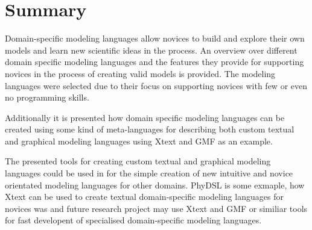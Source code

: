 \documentclass[runningheads,a4paper]{llncs}
\begin{document}
\section{Summary}\label{sec:summary}
Domain-specific modeling languages allow novices to build and explore  their own models and learn new scientific ideas in the process.
An overview over different domain specific modeling languages and the features they provide for 
supporting novices in the process of creating valid models is provided.
The modeling languages were selected due to their focus on supporting novices with few or even no programming skills.

Additionally it is presented how domain specific modeling languages can be created using some kind of meta-languages
for describing both custom textual and graphical modeling languages using Xtext and GMF as an example.

The presented tools for creating custom textual and graphical modeling languages could be used in for the simple creation of new intuitive and 
novice orientated modeling languages for other domains. PhyDSL is some exmaple, how Xtext can be used to create textual domain-specific modeling languages 
for novices was and future research project may use Xtext and GMF or similiar tools for fast developent of specialised domain-specific modeling languages.  

% 
% 

%
%
\printbibliography
\end{document}
